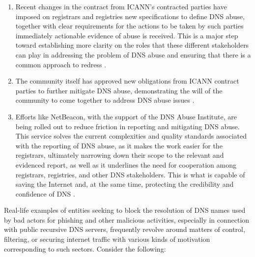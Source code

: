 \begin{enumerate}
  \item Recent changes in the contract from ICANN's contracted parties have imposed on registrars and registries new specifications to define DNS abuse, together with clear requirements for the actions to be taken by such parties immediately actionable evidence of abuse is received. This is a major step toward establishing more clarity on the roles that these different stakeholders can play in addressing the problem of DNS abuse and ensuring that there is a common approach to redress \cite{Weinstein2023}.
  \item The community itself has approved new obligations from ICANN contract parties to further mitigate DNS abuse, demonstrating the will of the community to come together to address DNS abuse issues \cite{ICANN2023}.
  \item Efforts like NetBeacon, with the support of the DNS Abuse Institute, are being rolled out to reduce friction in reporting and mitigating DNS abuse. This service solves the current complexities and quality standards associated with the reporting of DNS abuse, as it makes the work easier for the registrars, ultimately narrowing down their scope to the relevant and evidenced report, as well as it underlines the need for cooperation among registrars, registries, and other DNS stakeholders. This is what is capable of saving the Internet and, at the same time, protecting the credibility and confidence of DNS \cite{NetBeacon}.
  
\end{enumerate}

Real-life examples of entities seeking to block the resolution of DNS names used by bad actors for phishing and other malicious activities, especially in connection with public recursive DNS servers, frequently revolve around matters of control, filtering, or securing internet traffic with various kinds of motivation corresponding to such sectors. Consider the following:

